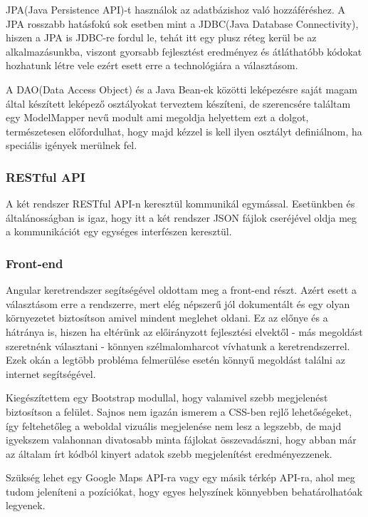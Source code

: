 JPA(Java Persistence API)-t használok az adatbázishoz való hozzáféréshez. A JPA rosszabb hatásfokú sok esetben mint a JDBC(Java Database Connectivity), hiszen a JPA is JDBC-re fordul le, tehát itt egy plusz réteg kerül be az alkalmazásunkba, viszont gyorsabb fejlesztést eredményez és átláthatóbb kódokat hozhatunk létre vele ezért esett erre a technológiára a választásom.

A DAO(Data Access Object) és a Java Bean-ek közötti leképezésre saját magam által készített leképező osztályokat terveztem készíteni, de szerencsére találtam egy ModelMapper nevű modult ami megoldja helyettem ezt a dolgot, természetesen előfordulhat, hogy majd kézzel is kell ilyen osztályt definiálnom, ha speciális igények merülnek fel.

\subsubsection{RESTful API}

A két rendszer RESTful API-n keresztül kommunikál egymással. Esetünkben és általánosságban is igaz, hogy itt a két rendszer JSON fájlok cseréjével oldja meg a kommunikációt egy egységes interfészen keresztül.

\subsubsection{Front-end}

Angular keretrendszer segítségével oldottam meg a front-end részt. Azért esett a választásom erre a rendszerre, mert elég népszerű jól dokumentált és egy olyan környezetet biztosítson amivel mindent meglehet oldani. Ez az előnye és a hátránya is, hiszen ha eltérünk az előirányzott fejlesztési elvektől - más megoldást szeretnénk választani - könnyen szélmalomharcot vívhatunk a keretrendszerrel. Ezek okán a legtöbb probléma felmerülése esetén könnyű megoldást találni az internet segítségével.

Kiegészítettem egy Bootstrap modullal, hogy valamivel szebb megjelenést biztosítson a felület. Sajnos nem igazán ismerem a CSS-ben rejlő lehetőségeket, így feltehetőleg a weboldal vizuális megjelenése nem lesz a legszebb, de majd igyekszem valahonnan divatosabb minta fájlokat összevadászni, hogy abban már az általam írt kódból kinyert adatok szebb megjelenítést eredményezzenek.

Szükség lehet egy Google Maps API-ra vagy egy másik térkép API-ra, ahol meg tudom jeleníteni a pozíciókat, hogy egyes helyszínek könnyebben behatárolhatóak legyenek.

